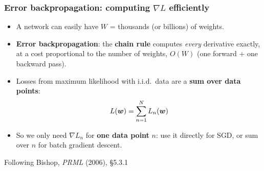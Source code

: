 \documentclass[10pt]{beamer}
\begin{document}
\begin{frame}[fragile]
\frametitle{Error backpropagation: computing $\nabla L$ efficiently}

\begin{itemize}
\item A network can easily have $W$ = thousands (or billions) of weights.
\item[$\Rightarrow$] \textbf{Error backpropagation}: the \textbf{chain rule}
  computes \emph{every} derivative exactly, at a cost proportional to the
  number of weights, $O(W)$ (one forward $+$ one backward pass).
\end{itemize}

\vspace{4pt}
\begin{itemize}
\item Losses from maximum likelihood with i.i.d.\ data are a \textbf{sum
  over data points}:
\[
L(\boldsymbol{w}) = \sum_{n=1}^{N} L_n(\boldsymbol{w})
\]
\item So we only need $\nabla L_n$ for \textbf{one data point} $n$: use it
  directly for SGD, or sum over $n$ for batch gradient descent.
\end{itemize}

\vspace{4pt}
{\scriptsize Following Bishop, \emph{PRML} (2006), \S5.3.1}

\end{frame}
\end{document}
